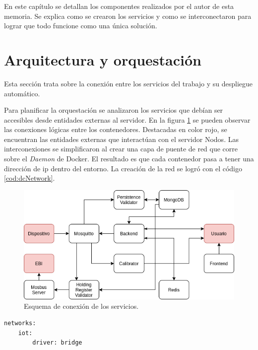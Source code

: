 En este capítulo se detallan los componentes realizados por el autor de esta memoria.
Se explica como se crearon los servicios y como se interconectaron para lograr que todo funcione como una única solución.

\section{Arquitectura y orquestación}
Esta sección trata sobre la conexión entre los servicios del trabajo y su despliegue automático.

Para planificar la orquestación se analizaron los servicios que debían ser accesibles desde entidades externas al servidor.
En la figura \ref{fig:ch3EsquemaTrabajo} se pueden observar las conexiones lógicas entre los contenedores.
Destacadas en color rojo, se encuentran las entidades externas que interactúan con el servidor Nodos.
Las interconexiones se simplificaron al crear una capa de puente de red que corre sobre el \emph{Daemon} de Docker.
El resultado es que cada contenedor pasa a tener una dirección de ip dentro del entorno.
La creación de la red se logró con el código \ref{cod:dcNetwork}.

\begin{figure}[h]
	\centering
	\includegraphics[width=\textwidth]{./Figures/ch3EsquemaTrabajo.png}
	\caption{Esquema de conexión de los servicios.}
	\label{fig:ch3EsquemaTrabajo}
\end{figure}

\begin{lstlisting}[label=cod:dcNetwork,caption=Red de interconexión Docker Compose.]
networks: 
	iot:
		driver: bridge
\end{lstlisting}

